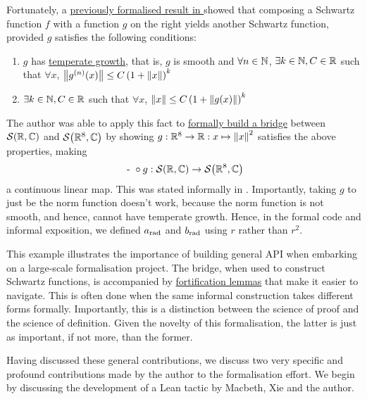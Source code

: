 Fortunately, a \href{https://github.com/leanprover-community/mathlib4/blob/dd2606726d6b0601d394911f9e7a6fa0f01367a3/Mathlib/Analysis/Distribution/SchwartzSpace.lean#L855-L916}{previously formalised result in \mathlib} showed that composing a Schwartz function $f$ with a function $g$ on the right yields another Schwartz function, provided $g$ satisfies the following conditions:
\begin{enumerate}
    \item $g$ has \href{https://github.com/leanprover-community/mathlib4/blob/dd2606726d6b0601d394911f9e7a6fa0f01367a3/Mathlib/Analysis/Distribution/SchwartzSpace.lean#L518-L521}{temperate growth}, that is, $g$ is smooth and $\forall n \in \mathbb{N}$, $\exists k \in \mathbb{N}, C \in \mathbb{R}$ such that $\forall x$, $\left\lVert g^{(n)}\!\left( x \right) \right\rVert \leq C \left( 1 + \left\lVert x \right\rVert \right)^k$
    \item $\exists k \in \mathbb{N}, C \in \mathbb{R}$ such that $\forall x$, $\left\lVert x \right\rVert \leq C\left( 1 + \left\lVert g(x) \right\rVert \right)^k$
\end{enumerate}
The author was able to apply this fact to \href{https://github.com/thefundamentaltheor3m/Sphere-Packing-Lean/blob/35ef2eb4ff481eff6656e7e70ea5fa274117f7c6/SpherePacking/ForMathlib/RadialSchwartz.lean#L38}{formally build a bridge} between $\mathcal{S}\!\left( \mathbb{R}, \mathbb{C} \right)$ and $\mathcal{S}\!\left( \mathbb{R}^8, \mathbb{C} \right)$ by showing $g : \mathbb{R}^8 \to \mathbb{R} : x \mapsto \left\lVert x \right\rVert^2$ satisfies the above properties, making
\begin{align*}
    \text{ - } \circ g : \mathcal{S}\!\left( \mathbb{R}, \mathbb{C} \right) \to \mathcal{S}\!\left( \mathbb{R}^8, \mathbb{C} \right)
\end{align*}
a continuous linear map. This was stated informally in . Importantly, taking $g$ to just be the norm function doesn't work, because the norm function is not smooth, and hence, cannot have temperate growth. Hence, in the formal code and informal exposition, we defined $a_{\operatorname{rad}}$ and $b_{\operatorname{rad}}$ using $r$ rather than $r^2$.

This example illustrates the importance of building general API when embarking on a large-scale formalisation project. The bridge, when used to construct Schwartz functions, is accompanied by \href{https://github.com/thefundamentaltheor3m/Sphere-Packing-Lean/blob/254a53fa70714a2b9199985616f7a4ba48457519/SpherePacking/MagicFunction/a/Schwartz.lean#L170}{fortification lemmas} that make it easier to navigate. This is often done when the same informal construction takes different forms formally. Importantly, this is a distinction between the science of proof and the science of definition. Given the novelty of this formalisation, the latter is just as important, if not more, than the former.

Having discussed these general contributions, we discuss two very specific and profound contributions made by the author to the formalisation effort. We begin by discussing the development of a Lean tactic by Macbeth, Xie and the author.